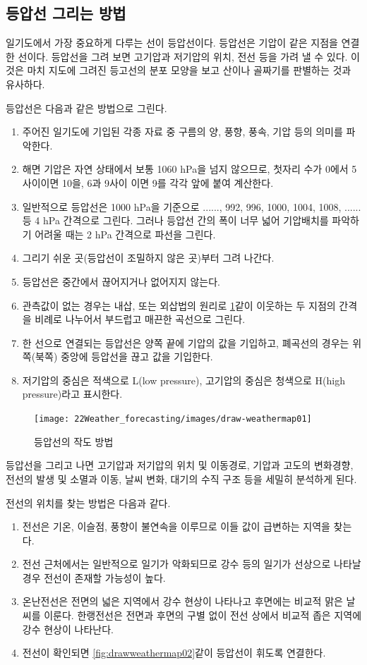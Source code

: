 \newpage
\subsection{등압선 그리는 방법}
일기도에서 가장 중요하게 다루는 선이 등압선이다. 등압선은 기압이 같은 지점을 연결한 선이다. 등압선을 그려 보면 고기압과 저기압의 위치, 전선 등을 가려 낼 수 있다. 이것은 마치 지도에 그려진 등고선의 분포 모양을 보고 산이나 골짜기를 판별하는 것과 유사하다. 

등압선은 다음과 같은 방법으로 그린다.
\begin{enumerate}
 \item 주어진 일기도에 기입된 각종 자료 중 구름의 양, 풍향, 풍속, 기압 등의 의미를 파악한다. 
 \item 해면 기압은 자연 상태에서 보통 1060 hPa을 넘지 않으므로, 첫자리 수가 0에서 5사이이면 10을, 6과 9사이 이면 9를 각각 앞에 붙여 계산한다.
 \item 일반적으로 등압선은 1000 hPa을 기준으로 ......, 992, 996, 1000, 1004, 1008, ...... 등 4 hPa 간격으로 그린다. 그러나 등압선 간의 폭이 너무 넓어 기압배치를 파악하기 어려울 때는 2 hPa 간격으로 파선을 그린다.
 \item 그리기 쉬운 곳(등압선이 조밀하지 않은 곳)부터 그려 나간다.
 \item 등압선은 중간에서 끊어지거나 없어지지 않는다.
 \item 관측값이 없는 경우는 내삽, 또는 외삽법의 원리로 \ref{fig:drawweathermap01}\과 같이 이웃하는 두 지점의 간격을 비례로 나누어서 부드럽고 매끈한 곡선으로 그린다.
 \item 한 선으로 연결되는 등압선은 양쪽 끝에 기압의 값을 기입하고, 폐곡선의 경우는 위쪽(북쪽) 중앙에 등압선을 끊고 값을 기입한다. 
 \item 저기압의 중심은 적색으로 L(low pressure), 고기압의 중심은 청색으로 H(high pressure)라고 표시한다.
\end{enumerate}

\begin{figure}[h]
	\centering
	\texttt{[image: 22Weather\_forecasting/images/draw-weathermap01]}
	\caption{등압선의 작도 방법}
	\label{fig:drawweathermap01}
\end{figure}

등압선을 그리고 나면 고기압과 저기압의 위치 및 이동경로, 기압과 고도의 변화경향, 전선의 발생 및 소멸과 이동, 날씨 변화, 대기의 수직 구조 등을 세밀히 분석하게 된다. 

전선의 위치를 찾는 방법은 다음과 같다.

\begin{enumerate}
 \item 전선은 기온, 이슬점, 풍향이 불연속을 이루므로 이들 값이 급변하는 지역을 찾는다.
 \item 전선 근처에서는 일반적으로 일기가 악화되므로 강수 등의 일기가 선상으로 나타날 경우 전선이 존재할 가능성이 높다. 
 \item 온난전선은 전면의 넓은 지역에서 강수 현상이 나타나고 후면에는 비교적 맑은 날씨를 이룬다. 한랭전선은 전면과 후면의 구별 없이 전선 상에서 비교적 좁은 지역에 강수 현상이 나타난다.
 \item 전선이 확인되면 \ref{fig:drawweathermap02}\와 같이 등압선이 휘도록 연결한다.
\end{enumerate}

